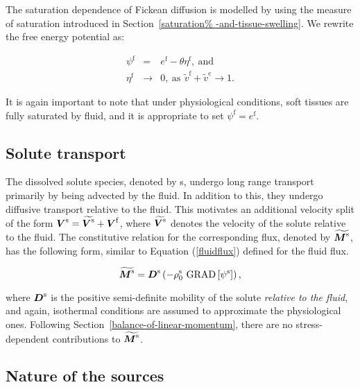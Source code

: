 The saturation dependence of Fickean diffusion is modelled by using
the measure of saturation introduced in Section~\ref{saturation%
  -and-tissue-swelling}. We rewrite the free energy potential as:

\begin{eqnarray}
\psi^\mathrm{f} &=& e^\mathrm{f} -
\theta\eta^\mathrm{f},\ \mathrm{and}\nonumber\\ \eta^\mathrm{f} &\to&
0,\ \mathrm{as}\ \, \tilde{v}^\mathrm{f} + \tilde{v}^\mathrm{c} \to 1.
\label{fickeanmobility}
\end{eqnarray}

\noindent It is again important to note that under physiological
conditions, soft tissues are fully saturated by fluid, and it is
appropriate to set $\psi^\mathrm{f} = e^\mathrm{f}$.

\subsection{Solute transport}
\label{solute-transport}

The dissolved solute species, denoted by s, undergo long range
transport primarily by being advected by the fluid. In addition to
this, they undergo diffusive transport relative to the fluid. This
motivates an additional velocity split of the form
\mbox{$\mbox{\boldmath$ V$}^\mathrm{s} = \widetilde{\mbox{\boldmath$ V$}^\mathrm{s}}+\mbox{\boldmath$ V$}^\mathrm{f}$},
where $\widetilde{\mbox{\boldmath$ V$}^\mathrm{s}}$ denotes the velocity of the solute
relative to the fluid. The constitutive relation for the corresponding
flux, denoted by $\widetilde{\mbox{\boldmath$ M$}^\mathrm{s}}$, has the following form,
similar to Equation (\ref {fluidflux}) defined for the fluid flux.

\begin{equation}
\widetilde{\mbox{\boldmath$ M$}^\mathrm{s}} = \mbox{\boldmath$ D$}^\mathrm{s}\left( -
\rho^\mathrm{s}_0\ \mathrm{GRAD}\left[\psi^\mathrm{s}\right]\right),
\label{soluteflux}
\end{equation}

\noindent where $\mbox{\boldmath$ D$}^\mathrm{s}$ is the positive semi-definite
mobility of the solute {\em relative to the fluid}, and again,
isothermal conditions are assumed to approximate the physiological
ones. Following Section~\ref{balance-of-linear-momentum}, there are no
stress-dependent contributions to $\widetilde{\mbox{\boldmath$ M$}^\mathrm{s}}$.

\subsection{Nature of the sources}
\label{nature-of-sources}

